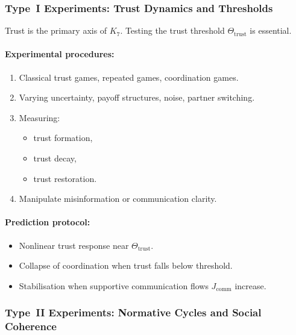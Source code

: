 \subsubsection{Type~I Experiments: Trust Dynamics and Thresholds}

Trust is the primary axis of $K_7$.
Testing the trust threshold $\Theta_{\mathrm{trust}}$ is essential.

\paragraph{Experimental procedures:}

\begin{enumerate}
    \item Classical trust games, repeated games, coordination games.
    \item Varying uncertainty, payoff structures, noise, partner switching.
    \item Measuring:
          \begin{itemize}
              \item trust formation,
              \item trust decay,
              \item trust restoration.
          \end{itemize}
    \item Manipulate misinformation or communication clarity.
\end{enumerate}

\paragraph{Prediction protocol:}

\begin{itemize}
    \item Nonlinear trust response near
          $\Theta_{\mathrm{trust}}$.
    \item Collapse of coordination when trust falls below threshold.
    \item Stabilisation when supportive communication flows $J_{\mathrm{comm}}$ increase.
\end{itemize}



\subsubsection{Type~II Experiments: Normative Cycles and Social Coherence}

